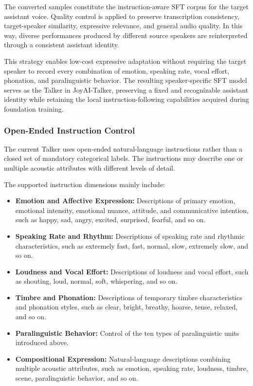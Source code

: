 The converted samples constitute the instruction-aware SFT corpus for the
target assistant voice. Quality control is applied to preserve transcription
consistency, target-speaker similarity, expressive relevance, and general audio
quality. In this way, diverse performances produced by different source
speakers are reinterpreted through a consistent assistant identity.

This strategy enables low-cost expressive adaptation without requiring the
target speaker to record every combination of emotion, speaking rate, vocal
effort, phonation, and paralinguistic behavior. The resulting speaker-specific
SFT model serves as the Talker in JoyAI-Talker, preserving a fixed and
recognizable assistant identity while retaining the local instruction-following
capabilities acquired during foundation training.

\subsubsection{Open-Ended Instruction Control}

The current Talker uses open-ended natural-language instructions rather than a closed set of mandatory categorical labels. The instructions may describe one or multiple acoustic attributes with different levels of detail.

The supported instruction dimensions mainly include:

\begin{itemize}
    \item \textbf{Emotion and Affective Expression:}
    Descriptions of primary emotion, emotional intensity, emotional nuance, attitude, and communicative intention, such as happy, sad, angry, excited, surprised, fearful, and so on.

    \item \textbf{Speaking Rate and Rhythm:}
    Descriptions of speaking rate and rhythmic characteristics, such as
extremely fast, fast, normal, slow, extremely slow, and so on.
    
    \item \textbf{Loudness and Vocal Effort:}
    Descriptions of loudness and vocal effort, such as shouting, loud,
normal, soft, whispering, and so on.

    \item \textbf{Timbre and Phonation:}
    Descriptions of temporary timbre characteristics and phonation styles, such as clear, bright, breathy, hoarse, tense, relaxed, and so on.

    \item \textbf{Paralinguistic Behavior:}
    Control of the ten types of paralinguistic units introduced above.

    \item \textbf{Compositional Expression:}
    Natural-language descriptions combining multiple acoustic attributes, such as emotion, speaking rate, loudness, timbre, scene, paralinguistic behavior, and so on.
\end{itemize}

